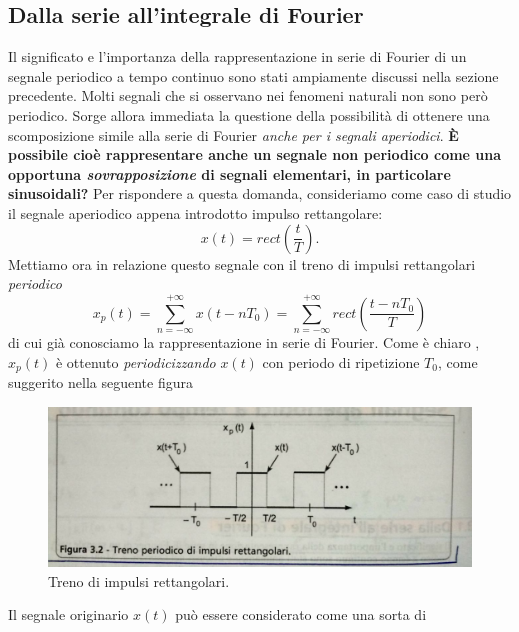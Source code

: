 \documentclass[12pt,oneside,openany]{memoir}
\numberwithin{equation}{subsection}
\begin{document}

\subsection{Dalla serie all'integrale di Fourier}
Il significato e l'importanza della rappresentazione in serie di Fourier di un
segnale periodico a tempo continuo sono stati ampiamente discussi nella sezione
precedente. Molti segnali che si osservano nei fenomeni naturali non sono per\`o
periodico. Sorge allora immediata la questione della possibilit\`a di ottenere
una scomposizione simile alla serie di Fourier \textit{anche per i segnali
aperiodici}. \textbf{\`E possibile cio\`e rappresentare anche un segnale non
periodico come una opportuna \textit{sovrapposizione} di segnali elementari, in
particolare sinusoidali?}
\bigbreak
Per rispondere a questa domanda, consideriamo come caso di studio il segnale
aperiodico appena introdotto impulso rettangolare:
\[
	x(t) = rect(\frac{t}{T}).
\]
Mettiamo ora in relazione questo segnale con il treno di impulsi rettangolari
\textit{periodico}
\begin{equation}
	x_p(t) = \sum_{n = -\infty}^{+\infty} x(t - nT_0) =
	\sum_{n = -\infty}^{+\infty} rect\left(\frac{t - nT_0}{T}\right)
\end{equation}
di cui gi\`a conosciamo la rappresentazione in serie di Fourier. Come \`e chiaro
, $x_p(t)$ \`e ottenuto \textit{periodicizzando} $x(t)$ con periodo di
ripetizione $T_0$, come suggerito nella seguente figura
\begin{figure}[H]
	\centering
	\captionsetup{justification=centering}
	\includegraphics[width=1.0\textwidth]{images/treno_di_impulsi_rettangolari_2.jpg}
	\caption{Treno di impulsi rettangolari.}
\end{figure}
Il segnale originario $x(t)$ pu\`o essere considerato come una sorta di
\end{document}
